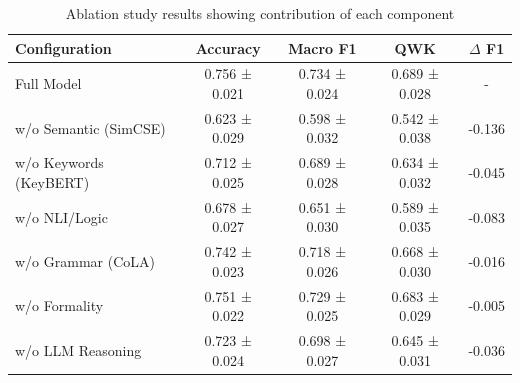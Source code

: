 
\begin{table}[h]
\centering
\caption{Ablation study results showing contribution of each component}
\label{tab:ablation}
\begin{tabular}{|l|c|c|c|c|}
\hline
\textbf{Configuration} & \textbf{Accuracy} & \textbf{Macro F1} & \textbf{QWK} & \textbf{$\Delta$ F1} \\ \hline
Full Model & 0.756 ± 0.021 & 0.734 ± 0.024 & 0.689 ± 0.028 & - \\ \hline
w/o Semantic (SimCSE) & 0.623 ± 0.029 & 0.598 ± 0.032 & 0.542 ± 0.038 & -0.136 \\ \hline
w/o Keywords (KeyBERT) & 0.712 ± 0.025 & 0.689 ± 0.028 & 0.634 ± 0.032 & -0.045 \\ \hline
w/o NLI/Logic & 0.678 ± 0.027 & 0.651 ± 0.030 & 0.589 ± 0.035 & -0.083 \\ \hline
w/o Grammar (CoLA) & 0.742 ± 0.023 & 0.718 ± 0.026 & 0.668 ± 0.030 & -0.016 \\ \hline
w/o Formality & 0.751 ± 0.022 & 0.729 ± 0.025 & 0.683 ± 0.029 & -0.005 \\ \hline
w/o LLM Reasoning & 0.723 ± 0.024 & 0.698 ± 0.027 & 0.645 ± 0.031 & -0.036 \\ \hline
\end{tabular}
\end{table}
